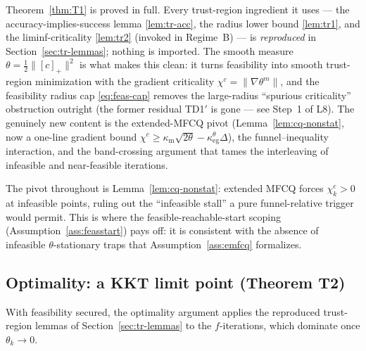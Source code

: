 \begin{remark}
  Theorem~\ref{thm:T1} is proved in full. Every trust-region ingredient it uses ---
  the accuracy-implies-success lemma \ref{lem:tr-acc}, the radius lower bound
  \ref{lem:tr1}, and the liminf-criticality \ref{lem:tr2} (invoked in Regime~B) --- is
  \emph{reproduced} in Section~\ref{sec:tr-lemmas}; nothing is imported. The smooth
  measure $\theta=\tfrac12\|[c]_+\|^2$ is what makes this clean: it turns feasibility
  into smooth trust-region minimization with the gradient criticality
  $\chi^c=\|\nabla\theta^m\|$, and the feasibility radius cap \eqref{eq:feas-cap}
  removes the large-radius ``spurious criticality'' obstruction outright (the former
  residual TD1$'$ is gone --- see Step~1 of L8). The genuinely new content is the
  extended-MFCQ pivot (Lemma~\ref{lem:cq-nonstat}, now a one-line gradient bound
  $\chi^c\ge\kappa_{\mathrm m}\sqrt{2\theta}-\kappa_{\mathrm{eg}}^\theta\Delta$), the
  funnel--inequality interaction, and the band-crossing argument that tames the
  interleaving of infeasible and near-feasible iterations.

  The pivot throughout is Lemma~\ref{lem:cq-nonstat}: extended MFCQ forces
  $\chi_k^c>0$ at infeasible points, ruling out the ``infeasible stall'' a pure
  funnel-relative trigger would permit. This is where the feasible-reachable-start
  scoping (Assumption~\ref{ass:feasstart}) pays off: it is consistent with the absence
  of infeasible $\theta$-stationary traps that Assumption~\ref{ass:emfcq} formalizes.
\end{remark}

\subsection{Optimality: a KKT limit point (Theorem T2)}
\label{sec:T2}

With feasibility secured, the optimality argument applies the reproduced
trust-region lemmas of Section~\ref{sec:tr-lemmas} to the $f$-iterations, which
dominate once $\theta_k\to0$.

